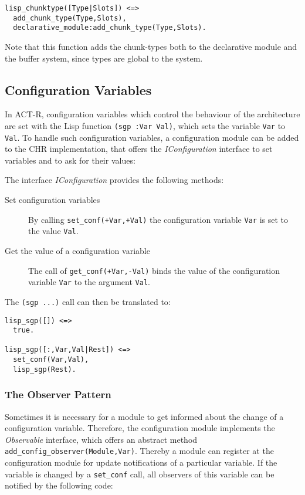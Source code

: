 \begin{lstlisting}
lisp_chunktype([Type|Slots]) <=>
  add_chunk_type(Type,Slots),
  declarative_module:add_chunk_type(Type,Slots).
\end{lstlisting}

Note that this function adds the chunk-types both to the declarative module and the buffer system, since types are global to the system.

\subsection{Configuration Variables}
\label{configuration}

In ACT-R, configuration variables which control the behaviour of the architecture are set with the Lisp function \lstinline|(sgp :Var Val)|, which sets the variable \lstinline|Var| to \lstinline|Val|. To handle such configuration variables, a configuration module can be added to the CHR implementation, that offers the \emph{IConfiguration} interface to set variables and to ask for their values:

\begin{definition}[IConfiguration]
\label{def:iconfiguration}
The interface \emph{IConfiguration} provides the following methods:
\begin{description}
 \item[Set configuration variables] By calling \lstinline|set_conf(+Var,+Val)| the configuration variable \lstinline|Var| is set to the value \lstinline|Val|.
 \item[Get the value of a configuration variable] The call of \lstinline|get_conf(+Var,-Val)| binds the value of the configuration variable \lstinline|Var| to the argument \lstinline|Val|.
\end{description}
\end{definition}

The \lstinline|(sgp ...)| call can then be translated to:

\begin{lstlisting}
lisp_sgp([]) <=>
  true.

lisp_sgp([:,Var,Val|Rest]) <=>
  set_conf(Var,Val),
  lisp_sgp(Rest).
\end{lstlisting}

\subsubsection{The Observer Pattern}

Sometimes it is necessary for a module to get informed about the change of a configuration variable. Therefore, the configuration module implements the \emph{Observable} interface, which offers an abstract method \lstinline|add_config_observer(Module,Var)|. Thereby a module can register at the configuration module for update notifications of a particular variable. If the variable is changed by a \lstinline|set_conf| call, all observers of this variable can be notified by the following code:


